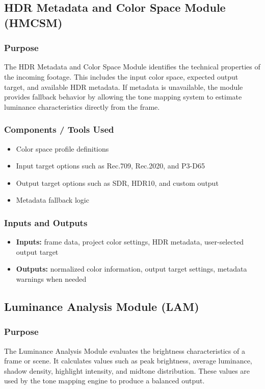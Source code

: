 \documentclass{article}
\begin{document}
\subsection{HDR Metadata and Color Space Module (HMCSM)}

\subsubsection*{Purpose}
The HDR Metadata and Color Space Module identifies the technical properties of the incoming footage. This includes the input color space, expected output target, and available HDR metadata. If metadata is unavailable, the module provides fallback behavior by allowing the tone mapping system to estimate luminance characteristics directly from the frame.

\subsubsection*{Components / Tools Used}
\begin{itemize}
    \item Color space profile definitions
    \item Input target options such as Rec.709, Rec.2020, and P3-D65
    \item Output target options such as SDR, HDR10, and custom output
    \item Metadata fallback logic
\end{itemize}

\subsubsection*{Inputs and Outputs}
\begin{itemize}
    \item \textbf{Inputs:} frame data, project color settings, HDR metadata, user-selected output target
    \item \textbf{Outputs:} normalized color information, output target settings, metadata warnings when needed
\end{itemize}


\subsection{Luminance Analysis Module (LAM)}

\subsubsection*{Purpose}
The Luminance Analysis Module evaluates the brightness characteristics of a frame or scene. It calculates values such as peak brightness, average luminance, shadow density, highlight intensity, and midtone distribution. These values are used by the tone mapping engine to produce a balanced output.
\end{document}
